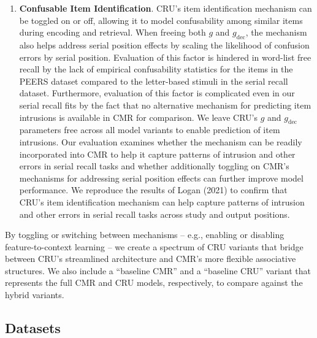 \documentclass[
  letterpaper,
  DIV=11,
  numbers=noendperiod]{scrartcl}
\begin{document}
\begin{enumerate}
  possible that in serial recall participants explicitly encode and
  retrieve an end-of-list marker as a signal that typing is done (Logan
  2018), but that in free recall participants instead attempt to
  continue recalling items until it is too difficult to do so or time
  runs out.
\item
  \textbf{Confusable Item Identification}. CRU's item identification
  mechanism can be toggled on or off, allowing it to model confusability
  among similar items during encoding and retrieval. When freeing both
  \(g\) and \(g_\text{dec}\), the mechanism also helps address serial
  position effects by scaling the likelihood of confusion errors by
  serial position. Evaluation of this factor is hindered in word-list
  free recall by the lack of empirical confusability statistics for the
  items in the PEERS dataset compared to the letter-based stimuli in the
  serial recall dataset. Furthermore, evaluation of this factor is
  complicated even in our serial recall fits by the fact that no
  alternative mechanism for predicting item intrusions is available in
  CMR for comparison. We leave CRU's \(g\) and \(g_\text{dec}\)
  parameters free across all model variants to enable prediction of item
  intrusions. Our evaluation examines whether the mechanism can be
  readily incorporated into CMR to help it capture patterns of intrusion
  and other errors in serial recall tasks and whether additionally
  toggling on CMR's mechanisms for addressing serial position effects
  can further improve model performance. We reproduce the results of
  Logan (2021) to confirm that CRU's item identification mechanism can
  help capture patterns of intrusion and other errors in serial recall
  tasks across study and output positions.
\end{enumerate}

By toggling or switching between mechanisms -- e.g., enabling or
disabling feature-to-context learning -- we create a spectrum of CRU
variants that bridge between CRU's streamlined architecture and CMR's
more flexible associative structures. We also include a ``baseline CMR''
and a ``baseline CRU'' variant that represents the full CMR and CRU
models, respectively, to compare against the hybrid variants.

\subsection{Datasets}\label{datasets}
\end{document}
